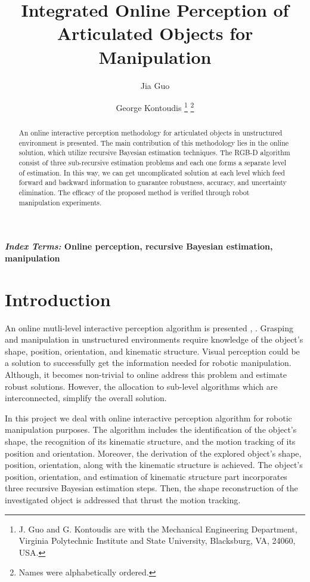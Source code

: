 \documentclass[letterpaper, 10 pt, conference]{ieeeconf}
\title{\LARGE \bf Integrated Online Perception of Articulated Objects for Manipulation}
\author{Jia Guo \and George Kontoudis
\thanks{J. Guo and G. Kontoudis are with the Mechanical Engineering Department, Virginia Polytechnic Institute and State University, Blacksburg, VA, 24060, USA.}%
\thanks{Names were alphabetically ordered.}}
\begin{document}
\maketitle
\thispagestyle{empty}
\pagestyle{empty}

\begin{abstract}
An online interactive perception methodology for articulated objects in unstructured environment is presented. The main contribution of this methodology lies in the online solution, which utilize recursive Bayesian estimation techniques. The RGB-D algorithm consist of three sub-recursive estimation problems and each one forms a separate level of estimation. In this way, we can get uncomplicated solution at each level which feed forward and backward information to guarantee robustness, accuracy, and uncertainty elimination. The efficacy of the proposed method is verified through robot manipulation experiments.     
\end{abstract}

\normalsize{\bf\small\emph{Index Terms:} Online perception, recursive Bayesian estimation, manipulation}  

\section{Introduction}\label{intro}
An online mutli-level interactive perception algorithm is presented \cite{martin2014online}, \cite{martin2016integrated}. Grasping and manipulation in unstructured environments require knowledge of the object's shape, position, orientation, and kinematic structure. Visual perception could be a solution to successfully get the information needed for robotic manipulation. Although, it becomes non-trivial to online address this problem and estimate robust solutions. However, the allocation to sub-level algorithms which are interconnected, simplify the overall solution.

In this project we deal with online interactive perception algorithm for robotic manipulation purposes. The algorithm includes the identification of the object's shape, the recognition of its kinematic structure, and the motion tracking of its position and orientation. Moreover, the derivation of the explored object's shape, position, orientation, along with the kinematic structure is achieved. The object's position, orientation, and estimation of kinematic structure part incorporates three recursive Bayesian estimation steps. Then, the shape reconstruction of the investigated object is addressed that thrust the motion tracking.
\end{document}
